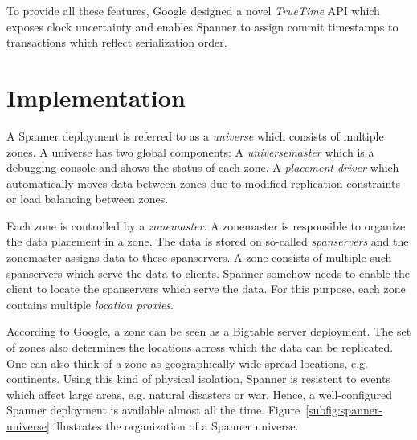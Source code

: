 \documentclass[onecolumn, a4paper, 10pt]{article}
\begin{document}
To provide all these features, Google designed a novel \emph{TrueTime} API which
exposes clock uncertainty and enables Spanner to assign commit timestamps to
transactions which reflect serialization order.

\section{Implementation}
\label{sec:implementation}

A Spanner deployment is referred to as a \emph{universe} which consists of
multiple zones. A universe has two global components: A \emph{universemaster}
which is a debugging console and shows the status of each zone. A
\emph{placement driver} which automatically moves data between zones due to
modified replication constraints or load balancing between zones.

Each zone is controlled by a \emph{zonemaster}. A zonemaster is responsible to
organize the data placement in a zone. The data is stored on so-called
\emph{spanservers} and the zonemaster assigns data to these spanservers. A zone
consists of multiple such spanservers which serve the data to clients. Spanner
somehow needs to enable the client to locate the spanservers which serve the data.
For this purpose, each zone contains multiple \emph{location proxies}.

According to Google, a zone can be seen as a Bigtable server deployment. The set
of zones also determines the locations across which the data can be replicated.
One can also think of a zone as geographically wide-spread locations, e.g.
continents. Using this kind of physical isolation, Spanner is resistent to events
which affect large areas, e.g. natural disasters or war. Hence, a well-configured
Spanner deployment is available almost all the time.
Figure~\ref{subfig:spanner-universe} illustrates the organization of a Spanner
universe.
\end{document}
